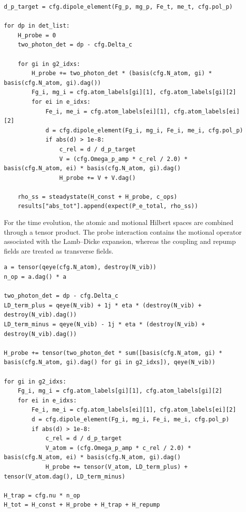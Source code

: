 \documentclass[../../thesis_main.tex]{subfiles}
\begin{document}
\begin{lstlisting}[caption={Steady-state Fano calculation for the multilevel model.},
label={lst:multilevel_fano}]
d_p_target = cfg.dipole_element(Fg_p, mg_p, Fe_t, me_t, cfg.pol_p)

for dp in det_list:
    H_probe = 0
    two_photon_det = dp - cfg.Delta_c

    for gi in g2_idxs:
        H_probe += two_photon_det * (basis(cfg.N_atom, gi) * basis(cfg.N_atom, gi).dag())
        Fg_i, mg_i = cfg.atom_labels[gi][1], cfg.atom_labels[gi][2]
        for ei in e_idxs:
            Fe_i, me_i = cfg.atom_labels[ei][1], cfg.atom_labels[ei][2]
            d = cfg.dipole_element(Fg_i, mg_i, Fe_i, me_i, cfg.pol_p)
            if abs(d) > 1e-8:
                c_rel = d / d_p_target
                V = (cfg.Omega_p_amp * c_rel / 2.0) * basis(cfg.N_atom, ei) * basis(cfg.N_atom, gi).dag()
                H_probe += V + V.dag()

    rho_ss = steadystate(H_const + H_probe, c_ops)
    results["abs_tot"].append(expect(P_e_total, rho_ss))
\end{lstlisting}

For the time evolution, the atomic and motional Hilbert spaces are
combined through a tensor product. The probe interaction contains the
motional operator associated with the Lamb--Dicke expansion, whereas
the coupling and repump fields are treated as transverse fields.

\begin{lstlisting}[caption={Hamiltonian construction for the Monte Carlo simulation.},
label={lst:multilevel_simulation}]
a = tensor(qeye(cfg.N_atom), destroy(N_vib))
n_op = a.dag() * a

two_photon_det = dp - cfg.Delta_c
LD_term_plus = qeye(N_vib) + 1j * eta * (destroy(N_vib) + destroy(N_vib).dag())
LD_term_minus = qeye(N_vib) - 1j * eta * (destroy(N_vib) + destroy(N_vib).dag())

H_probe += tensor(two_photon_det * sum([basis(cfg.N_atom, gi) * basis(cfg.N_atom, gi).dag() for gi in g2_idxs]), qeye(N_vib))

for gi in g2_idxs:
    Fg_i, mg_i = cfg.atom_labels[gi][1], cfg.atom_labels[gi][2]
    for ei in e_idxs:
        Fe_i, me_i = cfg.atom_labels[ei][1], cfg.atom_labels[ei][2]
        d = cfg.dipole_element(Fg_i, mg_i, Fe_i, me_i, cfg.pol_p)
        if abs(d) > 1e-8:
            c_rel = d / d_p_target
            V_atom = (cfg.Omega_p_amp * c_rel / 2.0) * basis(cfg.N_atom, ei) * basis(cfg.N_atom, gi).dag()
            H_probe += tensor(V_atom, LD_term_plus) + tensor(V_atom.dag(), LD_term_minus)

H_trap = cfg.nu * n_op
H_tot = H_const + H_probe + H_trap + H_repump
\end{lstlisting}
\end{document}
